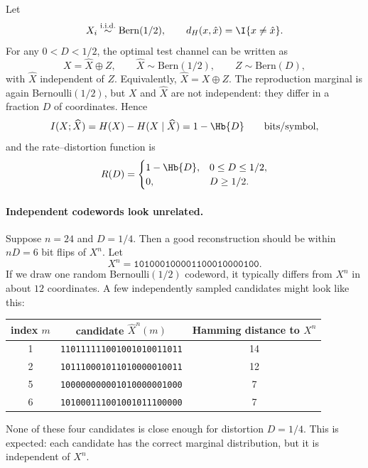 Let
\[
    X_i\overset{\text{i.i.d.}}{\sim}\mathrm{Bern}(1/2),
    \qquad
    d_H(x,\hat x)=\I{x\neq \hat x}.
\]
For any $0<D<1/2$, the optimal test channel can be written as
\begin{equation}
    X=\widehat X\oplus Z,
    \qquad
    \widehat X\sim \mathrm{Bern}(1/2),
    \qquad
    Z\sim \mathrm{Bern}(D),
\end{equation}
with $\widehat X$ independent of $Z$.
Equivalently, $\widehat X=X\oplus Z$.
The reproduction marginal is again Bernoulli$(1/2)$, but $X$ and $\widehat X$ are not independent: they differ in a fraction $D$ of coordinates.
Hence
\begin{equation}
    I(X;\widehat X)=H(X)-H(X\mid \widehat X)=1-\Hb{D}
    \qquad\text{bits/symbol},
\end{equation}
and the rate--distortion function is
\begin{equation}
R(D)=
\begin{cases}
1-\Hb{D}, & 0\le D\le 1/2,\\
0, & D\ge 1/2.
\end{cases}
\end{equation}

\paragraph{Independent codewords look unrelated.}
Suppose $n=24$ and $D=1/4$.
Then a good reconstruction should be within $nD=6$ bit flips of $X^n$.
Let
\[
X^n=\texttt{101000100001100010000100}.
\]
If we draw one random Bernoulli$(1/2)$ codeword, it typically differs from $X^n$ in about $12$ coordinates.
A few independently sampled candidates might look like this:
\begin{center}
\begin{tabular}{c|c|c}
index $m$ & candidate $\widehat X^n(m)$ & Hamming distance to $X^n$ \\
\hline
1 & \texttt{110111111001001010011011} & 14 \\
2 & \texttt{101110001011010000010011} & 12 \\
5 & \texttt{100000000001010000001000} & 7 \\
6 & \texttt{101000111001001011100000} & 7
\end{tabular}
\end{center}
None of these four candidates is close enough for distortion $D=1/4$.
This is expected: each candidate has the correct marginal distribution, but it is independent of $X^n$.

